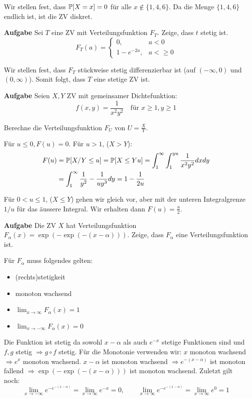 Wir stellen fest, dass $\mathbb{P}[X = x] = 0$ für alle $x \notin \{1,4,6\}$. Da die Menge $\{1,4,6\}$ endlich ist, ist die ZV diskret.

\hrulefill

\textbf{Aufgabe}
Sei $T$ eine ZV mit Verteilungsfunktion $F_T$. Zeige, dass $t$ stetig ist.
$$ F_T(a) = \begin{cases}
	0, 				& a < 0 \\
	1 - e^{-2a}, 	& a < \geq 0
\end{cases}$$ \medskip

Wir stellen fest, dass $F_T$ stückweise stetig differenzierbar ist (auf $(-\infty, 0)$ und $(0, \infty)$). Somit folgt, dass $T$ eine stetige ZV ist.

\hrulefill

\textbf{Aufgabe}
Seien $X,Y$ ZV mit gemeinsamer Dichtefunktion:
$$f(x,y) = \frac{1}{x^2 y^2} \quad \text{für } x \geq 1, y \geq 1$$

Berechne die Verteilungsfunktion $F_U$ von $U = \frac{X}{Y}$. \medskip

Für $u \leq 0, F(u) = 0$. Für $u > 1$, ($X > Y$):
\begin{align*}
	F(u) &= \mathbb{P}[X/Y \leq u] = \mathbb{P}[X \leq Yu] = \int_1^\infty \int_1^{yu} \frac{1}{x^2 y^2} dxdy\\
	&= \int_1^\infty \frac{1}{y^2} - \frac{1}{uy^3} dy = 1 - \frac{1}{2u}
\end{align*}

Für $0 < u \leq 1$, ($X \leq Y$) gehen wir gleich vor, aber mit der unteren Integralgrenze $1/u$ für das äussere Integral. Wir erhalten dann $F(u) = \frac{u}{2}$.

\hrulefill

\textbf{Aufgabe}
Die ZV $X$ hat Verteilungsfunktion $F_\alpha(x) = \exp (-\exp (- (x - \alpha)))$. Zeige, dass $F_\alpha$ eine Verteilungsfunktion ist. \smallskip

Für $F_\alpha$ muss folgendes gelten:
\begin{itemize}
	\item (rechts)stetigkeit
	\item monoton wachsend
	\item $\lim_{x \to \infty} F_\alpha(x) = 1$
	\item $\lim_{x \to -\infty} F_\alpha(x) = 0$
\end{itemize}

Die Funktion ist stetig da sowohl $x - \alpha$ als auch $e^{-x}$ stetige Funktionen sind und $f,g$ stetig $\Rightarrow g \circ f$ stetig. Für die Monotonie verwenden wir: $x$ monoton wachsend $\Rightarrow e^x$ monoton wachsend. $x - \alpha$ ist monoton wachsend $\Rightarrow e^{-(x- \alpha)}$ ist monoton fallend $\Rightarrow \exp (-\exp (- (x - \alpha)))$ ist monoton wachsend. Zuletzt gilt noch:
$$\lim_{x \to -\infty} e^{- e^{-(x-\alpha)}} = \lim_{x \to \infty} e^{-x} = 0, \qquad \lim_{x \to \infty} e^{- e^{-(x-\alpha)}} = \lim_{x \to \infty} e^0 = 1$$

